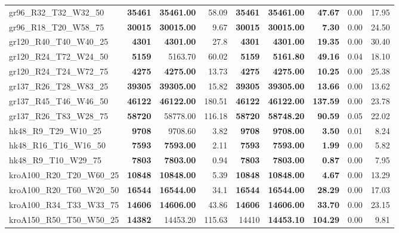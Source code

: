 \documentclass{singlecol-new}
\begin{document}
{\begin{longtable}{lrrrrrrrr}
		gr96\_R32\_T32\_W32\_50 & \textbf{35461} & \textbf{35461.00} & 58.09 & \textbf{35461} & \textbf{35461.00} & \textbf{47.67} & 0.00 & 17.95 \\
		gr96\_R18\_T20\_W58\_75 & \textbf{30015} & \textbf{30015.00} & 9.67 & \textbf{30015} & \textbf{30015.00} & \textbf{7.30} & 0.00 & 24.50 \\
		gr120\_R40\_T40\_W40\_25 & \textbf{4301} & \textbf{4301.00} & 27.8 & \textbf{4301} & \textbf{4301.00} & \textbf{19.35} & 0.00 & 30.40 \\
		gr120\_R24\_T72\_W24\_50 & \textbf{5159} & 5163.70 & 60.02 & \textbf{5159} & \textbf{5161.80} & \textbf{49.16} & 0.04 & 18.10 \\
		gr120\_R24\_T24\_W72\_75 & \textbf{4275} & \textbf{4275.00} & 13.73 & \textbf{4275} & \textbf{4275.00} & \textbf{10.25} & 0.00 & 25.38 \\
		gr137\_R26\_T28\_W83\_25 & \textbf{39305} & \textbf{39305.00} & 15.82 & \textbf{39305} & \textbf{39305.00} & \textbf{13.66} & 0.00 & 13.62 \\
		gr137\_R45\_T46\_W46\_50 & \textbf{46122} & \textbf{46122.00} & 180.51 & \textbf{46122} & \textbf{46122.00} & \textbf{137.59} & 0.00 & 23.78 \\
		gr137\_R26\_T83\_W28\_75 & \textbf{58720} & 58778.00 & 116.18 & \textbf{58720} & \textbf{58748.20} & \textbf{90.59} & 0.05 & 22.02 \\
		hk48\_R9\_T29\_W10\_25 & \textbf{9708} & 9708.60 & 3.82 & \textbf{9708} & \textbf{9708.00} & \textbf{3.50} & 0.01 & 8.24 \\
		hk48\_R16\_T16\_W16\_50 & \textbf{7593} & \textbf{7593.00} & 2.11 & \textbf{7593} & \textbf{7593.00} & \textbf{1.99} & 0.00 & 5.82 \\
		hk48\_R9\_T10\_W29\_75 & \textbf{7803} & \textbf{7803.00} & 0.94 & \textbf{7803} & \textbf{7803.00} & \textbf{0.87} & 0.00 & 7.95 \\
		kroA100\_R20\_T20\_W60\_25 & \textbf{10848} & \textbf{10848.00} & 5.39 & \textbf{10848} & \textbf{10848.00} & \textbf{4.67} & 0.00 & 13.29 \\
		kroA100\_R20\_T60\_W20\_50 & \textbf{16544} & \textbf{16544.00} & 34.1 & \textbf{16544} & \textbf{16544.00} & \textbf{28.29} & 0.00 & 17.03 \\
		kroA100\_R34\_T33\_W33\_75 & \textbf{14606} & \textbf{14606.00} & 43.86 & \textbf{14606} & \textbf{14606.00} & \textbf{33.70} & 0.00 & 23.15 \\
		kroA150\_R50\_T50\_W50\_25 & \textbf{14382} & 14453.20 & 115.63 & 14410 & \textbf{14453.10} & \textbf{104.29} & 0.00 & 9.81 \\

\end{longtable}}
\end{document}
